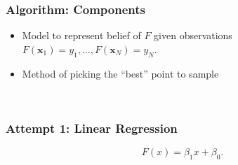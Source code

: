 \documentclass[draft]{beamer}
\begin{document}
\begin{frame}
    \frametitle{Algorithm: Components}
    \begin{itemize}
        \item Model to represent belief of $F$ given observations $F(\mathbf{x}_1) = y_1, \dots, F(\mathbf{x}_N) = y_N$.
            \pause
        \item Method of picking the ``best'' point to sample
    \end{itemize}
\end{frame}

\
\begin{frame}
    \frametitle{Attempt 1: Linear Regression}
    \begin{equation*}
        F(x) = \beta_1 x + \beta_0.
    \end{equation*}
\end{frame}
\end{document}
